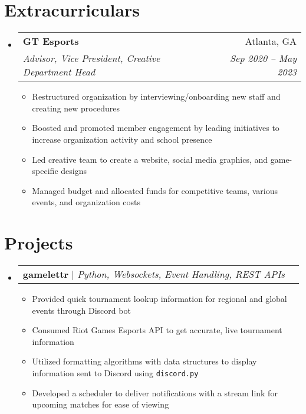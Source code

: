 \documentclass[letter,10pt]{extarticle}
\makeatletter
\newcommand{\resumeItem}[1]{
	\item\small{
		#1 \vspace{-1pt}
	}
}
\newcommand{\resumeProjectHeading}[3]{
	\vspace{-3pt}\item
		\begin{tabular*}{1\linewidth}{l@{\extracolsep{\fill}}r}
			\textbf{#1} $|$ \emph{#2} & #3 \\
		\end{tabular*}\vspace{-3pt}
}
\newcommand{\resumeSubheading}[4]{
	\vspace{-1pt}\item
		\begin{tabular*}{1\linewidth}{l@{\extracolsep{\fill}}r}
			\textbf{#1} & #2 \\
			\textit{#3} & \textit{#4} \\
		\end{tabular*}\vspace{-3pt}
}
\newcommand{\resumeSubHeadingListStart}{\begin{itemize}[leftmargin=0.15in,label={}]}
\newcommand{\resumeSubHeadingListEnd}{\end{itemize}}
\newcommand{\resumeItemListStart}{\begin{itemize}\vspace{-3pt}}
\newcommand{\resumeItemListEnd}{\end{itemize}\vspace{-3pt}}
\makeatother
\begin{document}
\section{Extracurriculars}
	\resumeSubHeadingListStart
        \resumeSubheading
            {GT Esports}
            {Atlanta, GA}
            {Advisor, Vice President, Creative Department Head}
            {Sep 2020 -- May 2023}
        \resumeItemListStart
            \resumeItem{Restructured organization by interviewing/onboarding new
                staff and creating new procedures}
            \resumeItem{Boosted and promoted member engagement by leading
            initiatives to increase organization activity and school presence}
            \resumeItem{Led creative team to create a website, social
                media graphics, and game-specific designs}
             \resumeItem{Managed budget and allocated funds for competitive teams, various events,
                and organization costs}
        \resumeItemListEnd
	\resumeSubHeadingListEnd

\section{Projects}
    \resumeSubHeadingListStart
    \vspace{1mm}
        \resumeProjectHeading
            {gamelettr}
            {Python, Websockets, Event Handling, REST APIs}
            {}
            \resumeItemListStart
                \resumeItem{Provided quick tournament lookup information for
                    regional and global events through Discord bot}
                \resumeItem{Consumed Riot Games Esports API to get accurate, live
                    tournament information}
                \resumeItem{Utilized formatting algorithms with data structures to
                    display information sent to Discord using \texttt{discord.py}}
                \resumeItem{Developed a scheduler to deliver notifications with
                    a stream link for upcoming matches for ease of viewing}
            \resumeItemListEnd

    \resumeSubHeadingListEnd
\end{document}
